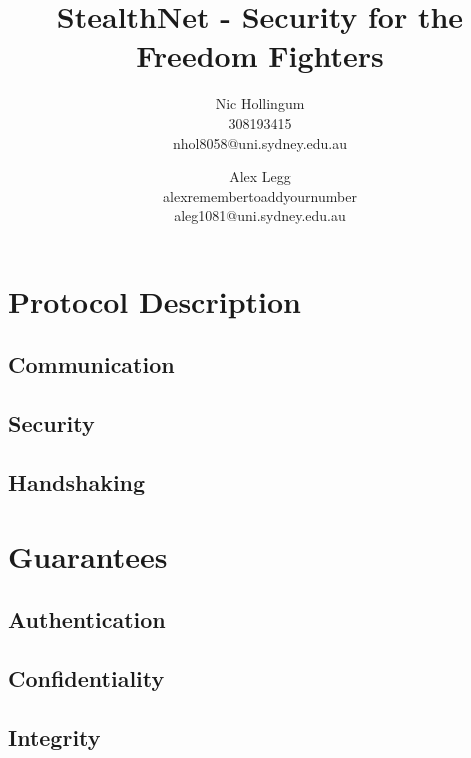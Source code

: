
\author{
		Nic Hollingum\\
		308193415\\
		nhol8058@uni.sydney.edu.au
	\and
		Alex Legg\\
		alexremembertoaddyournumber\\
		aleg1081@uni.sydney.edu.au
}
\title{StealthNet - Security for the Freedom Fighters}

\addtolength{\oddsidemargin}{-.875in}
\addtolength{\evensidemargin}{-.875in}
\addtolength{\textwidth}{1.75in}
\addtolength{\topmargin}{-.875in}
\addtolength{\textheight}{1.75in}


\maketitle

\section {Protocol Description}
\subsection{Communication}

\subsection{Security}

\subsection{Handshaking}

\section {Guarantees}
\subsection{Authentication}
\subsection{Confidentiality}
\subsection{Integrity}
